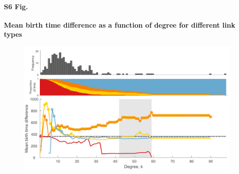 \documentclass[10pt,letterpaper]{article}
\begin{document}
\paragraph*{S6 Fig.}
{\bf Mean birth time difference as a function of degree for different link types}
\begin{figure}[!h]
\label{S6_Fig}
\centering
    \includegraphics[width=1\textwidth]{MeanBirthTimes.pdf}
\end{figure}


\end{document}
